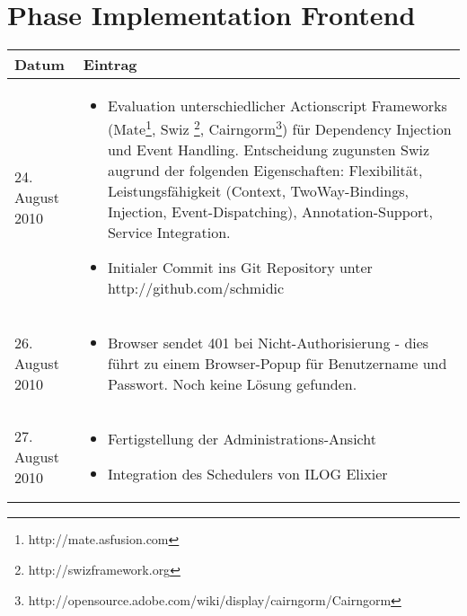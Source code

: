   \section{Phase Implementation Frontend}
  \begin{spacing}{0.5}
  \begin{longtable}{|p{4cm}|p{10cm}|}
\hline
  Datum & Eintrag\\
  \hline
  24. August 2010 & 
  \begin{itemize}
  \item Evaluation unterschiedlicher Actionscript Frameworks (Mate\footnote{http://mate.asfusion.com}, Swiz \footnote{http://swizframework.org}, Cairngorm\footnote{http://opensource.adobe.com/wiki/display/cairngorm/Cairngorm}) f\"ur Dependency Injection und Event Handling. Entscheidung zugunsten Swiz augrund der folgenden Eigenschaften: Flexibilit\"at, Leistungsf\"ahigkeit (Context, TwoWay-Bindings, Injection, Event-Dispatching), Annotation-Support, Service Integration.
  \item Initialer Commit ins Git Repository unter http://github.com/schmidic
  \end{itemize}\\
  \hline
  
 26. August 2010 & 
  \begin{itemize}
  \item Browser sendet 401 bei Nicht-Authorisierung - dies f\"uhrt zu einem Browser-Popup f\"ur Benutzername und Passwort. Noch keine L\"osung gefunden. 
  \end{itemize}\\
  \hline
  
 27. August 2010 & 
  \begin{itemize}
  \item Fertigstellung der Administrations-Ansicht
  \item Integration des Schedulers von ILOG Elixier
  \end{itemize}\\
  \hline
  
  
  
  
  \end{longtable}
  \end{spacing}

